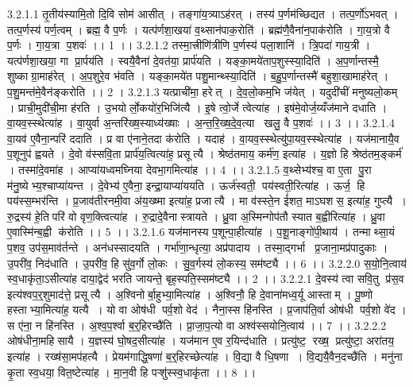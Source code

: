 3.2.1.1
तृ॒तीय॑स्यामि॒तो दि॒वि सोम॑ आसीत् । तङ्गा॑य॒त्र्याऽह॑रत् । तस्य॑ प॒र्णम॑च्छिद्यत । तत्प॒र्णो॑ऽभवत् । तत्प॒र्णस्य॑ पर्ण॒त्वम् । ब्रह्म॒ वै प॒र्णः । यत्प॑र्णशा॒खया॑ व॒थ्सान॑पाक॒रोति॑ । ब्रह्म॑णै॒वैना॑न॒पाक॑रोति । गा॒य॒त्रो वै प॒र्णः । गा॒य॒त्रा प॒शवः॑ ।। 1 ।।
3.2.1.2
तस्मा॒त्त्रीणि॑त्रीणि प॒र्णस्य॑ पला॒शानि॑ । त्रि॒पदा॑ गाय॒त्री । यत्प॑र्णशा॒खया॒ गा प्रा॒र्पय॑ति । स्वयै॒वैना॑ दे॒वत॑या॒ प्रार्प॑यति । यङ्का॒मये॑ताप॒शुस्स्या॒दिति॑ । अ॒प॒र्णान्तस्मै॒ शुष्काग्रा॒माह॑रेत् । अ॒प॒शुरे॒व भ॑वति । यङ्का॒मये॑त पशु॒मान्थ्स्या॒दिति॑ । ब॒हु॒प॒र्णान्तस्मै॑ बहुशा॒खामाह॑रेत् । प॒शु॒मन्त॑मे॒वैन॑ङ्करोति ।। 2 ।
3.2.1.3
यत्प्राची॑मा॒ हरेत् । दे॒व॒लो॒कम॒भि ज॑येत् । यदुदी॑चीं मनुष्यलो॒कम् । प्राची॒मुदी॑ची॒मा ह॑रति । उ॒भयोर्लो॒कयो॑र॒भिजि॑त्यै । इ॒षे त्वो॒र्जे त्वेत्या॑ह । इष॑मे॒वोर्ज॒य्यँज॑माने दधाति । वा॒यव॒स्स्थेत्या॑ह । वा॒युर्वा अ॒न्तरि॑ख्ष॒स्याध्य॑ख्षाः । अ॒न्त॒रि॒ख्ष॒दे॒व॒त्या खलु॒ वै प॒शवः॑ ।। 3 ।।
3.2.1.4
वा॒यव॑ ए॒वैना॒न्परि॑ ददाति । प्र वा ए॑नाने॒तदा क॑रोति । यदाह॑ । वा॒यव॒स्स्थेत्यु॑पा॒यव॒स्स्थेत्या॑ह । यज॑मानायै॒व प॒शूनुप॑ ह्वयते । दे॒वो व॑स्सवि॒ता प्रार्प॑य॒त्वित्या॑ह॒ प्रसूत्यै । श्रेष्ठ॑तमाय॒ कर्म॑ण॒ इत्या॑ह । य॒ज्ञो हि श्रेष्ठ॑तम॒ङ्कर्म॑ । तस्मा॑दे॒वमा॑ह । आप्या॑यध्वमघ्निया देवभा॒गमित्या॑ह ।। 4 ।।
3.2.1.5
व॒थ्सेभ्य॑श्च॒ वा ए॒ता पु॒रा म॑नु॒ष्येभ्य॒श्चाप्या॑यन्त । दे॒वेभ्य॑ ए॒वैना॒ इन्द्रा॒याप्या॑ययति । ऊर्ज॑स्वती॒ पय॑स्वती॒रित्या॑ह । ऊर्ज॒॒ हि पय॑स्स॒म्भर॑न्ति । प्र॒जाव॑तीरनमी॒वा अ॑य॒ख्ष्मा इत्या॑ह॒ प्रजात्यै । मा व॑स्स्ते॒न ई॑शत॒ माऽघश॑स॒ इत्या॑ह॒ गुप्त्यै । रु॒द्रस्य॑ हे॒तिपरि॑ वो वृण॒क्त्वित्या॑ह । रु॒द्रादे॒वैनास्त्रायते । ध्रु॒वा अ॒स्मिन्गोप॑तौ स्यात ब॒ह्वीरित्या॑ह । ध्रु॒वा ए॒वास्मि॑न्ब॒ह्वी क॑रोति ।। 5 ।।
3.2.1.6
यज॑मानस्य प॒शून्पा॒हीत्या॑ह । प॒शू॒नाङ्गो॑पी॒थाय॑ । तन्माथ्सा॒यं प॒शव॒ उप॑स॒माव॑र्तन्ते । अन॑धस्सादयति । गर्भा॑णा॒न्धृत्या॒ अप्र॑पादाय । तस्मा॒द्गर्भा प्र॒जाना॒मप्र॑पादुकाः । उ॒परी॑व॒ निद॑धाति । उ॒परी॑व॒ हि सु॑व॒र्गो लो॒कः । सु॒व॒र्गस्य॑ लो॒कस्य॒ सम॑ष्ट्यै ।। 6 ।।
3.2.2.0
स॒यो॒नि॒त्वाय॑ स्व॒धाकृ॑ता॒ऽसीत्या॑ह दाया॒द्वेद॑ भरति जायन्ते॒ बृह॒स्पति॒स्सम॑ष्ट्यै ।। 2 ।।
3.2.2.1
दे॒वस्य॑ त्वा सवि॒तु प्र॑स॒व इत्य॑श्वप॒र्॒शुमाद॑त्ते॒ प्रसूत्यै । अ॒श्विनोर्बा॒हुभ्या॒मित्या॑ह । अ॒श्विनौ॒ हि दे॒वाना॑मध्व॒र्यू आस्ताम् । पू॒ष्णो हस्ताभ्या॒मित्या॑ह॒ यत्यै । यो वा ओष॑धी पर्व॒शो वेद॑ । नैना॒स्स हि॑नस्ति । प्र॒जाप॑ति॒र्वा ओष॑धी पर्व॒शो वे॑द । स ए॑ना॒ न हि॑नस्ति । अ॒श्व॒प॒र्श्वा ब॒र्॒हिरच्छै॑ति । प्रा॒जा॒प॒त्यो वा अश्व॑स्सयोनि॒त्वाय॑ ।। 7 ।।
3.2.2.2
ओष॑धीना॒महि॑सायै । य॒ज्ञस्य॑ घो॒षद॒सीत्या॑ह । यज॑मान ए॒व र॒यिन्द॑धाति । प्रत्यु॑ष्ट॒॒ रख्ष॒ प्रत्यु॑ष्टा॒ अरा॑तय॒ इत्या॑ह । रख्ष॑सा॒मप॑हत्यै । प्रेयम॑गाद्धि॒षणा॑ ब॒र्॒हिरच्छेत्या॑ह । वि॒द्या वै धि॒षणा । वि॒द्ययै॒वैन॒दच्छै॑ति । मनु॑ना कृ॒ता स्व॒धया॒ वित॒ष्टेत्या॑ह । मा॒न॒वी हि पऱ्शु॑स्स्व॒धाकृ॑ता ।। 8 ।।
